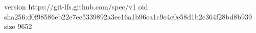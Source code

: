 version https://git-lfs.github.com/spec/v1
oid sha256:d0f98586eb22e7ee5339892a3ec16a1b96ca1c9e4c0e58d1b2c364f28bd8b939
size 9652
